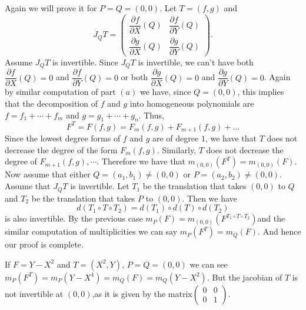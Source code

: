 \documentclass[12pt]{article}
\begin{document}
\noindent {} Again we will prove it for $P=Q=(0,0)$. Let $T = (f,g)$ and
$$
    J_Q T = \begin{pmatrix} \dfrac{\partial f}{\partial X}(Q) & \dfrac{\partial f}{\partial Y}(Q) \\ \dfrac{\partial g}{\partial X}(Q) & \dfrac{\partial g}{\partial Y}(Q) \end{pmatrix}.
$$
Assume $J_Q T$ is invertible. Since $J_Q T$ is invertible, we can't have both $\dfrac{\partial f}{\partial X}(Q) = 0$ and $\dfrac{\partial f}{\partial Y}(Q) = 0$ or both $\dfrac{\partial g}{\partial X}(Q) = 0$ and $\dfrac{\partial g}{\partial Y}(Q) = 0$. Again by similar computation of part $(a)$ we have, since $Q = (0,0)$, this implies that the decomposition of $f$ and $g$ into homogeneous polynomials are $f = f_1 + \cdots + f_m$
and $g = g_1 + \cdots + g_n$. Thus,
$$
    F^T = F(f,g) = F_m(f,g) + F_{m+1}(f,g) + \ldots
$$
Since the lowest degree forms of $f$ and $g$ are of degree $1$, we have that $T$ does not decrease the degree of the form $F_m(f,g)$. Similarly, $T$ does not decrease the degree of $F_{m+1}(f,g), \cdots$. Therefore we have that $m_{(0,0)}(F^T) = m_{(0,0)}(F)$. Now assume that either $Q = (a_1,b_1) \neq (0,0)$ or $P = (a_2,b_2) \neq (0,0)$. Assume that $J_Q T$ is invertible. Let $T_1$  be the translation that takes $(0,0)$ to $Q$ and $T_2$ be the translation that takes $P$ to $(0,0)$. Then we have
$$
    d(T_1\circ T\circ T_2) = d(T_1)\circ d(T) \circ d(T_2)
$$
is also invertible. By the previous case $m_P(F) = m_{(0,0)}(F^{T_1\circ T\circ T_2})$and the similar computation of multiplicities we can say $m_P(F^T)=m_Q(F)$. And hence our proof is complete.

\vspace*{0.2cm}

\noindent {} If $F= Y-X^2$ and $T =(X^2,Y)$, $P=Q =(0,0)$ we can see $m_P(F^T)=m_P(Y-X^4)=m_Q(F)=m_Q(Y-X^2)$. But the jacobian of $T$ is not invertible at $(0,0)$,as it is given by the matrix$\begin{pmatrix}
        0 & 0 \\
        0 & 1
    \end{pmatrix}$.\Qed
\end{document}
